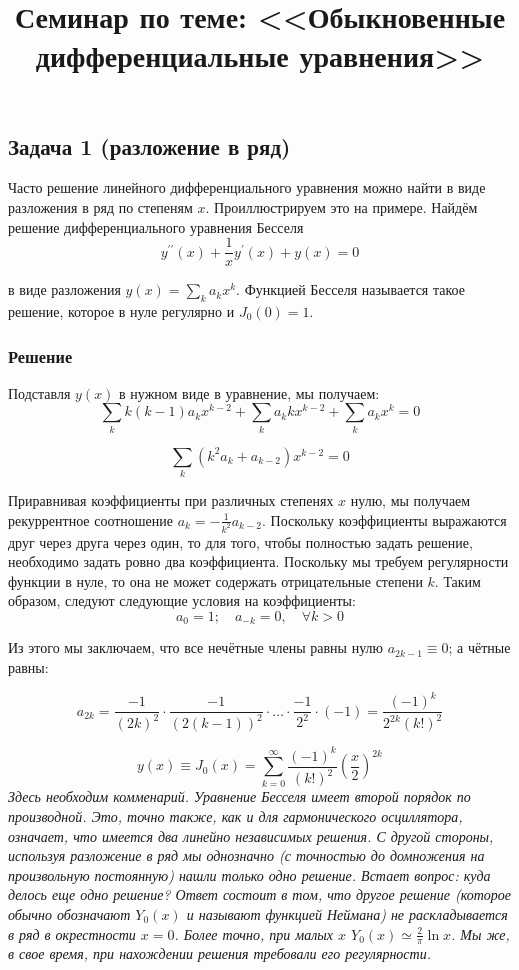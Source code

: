 \documentclass[a4paper,12pt]{article}
\begin{document}
\title{Семинар по теме: <<Обыкновенные дифференциальные уравнения>>}
\maketitle

\subsection*{Задача 1 (разложение в ряд)}

Часто решение линейного дифференциального уравнения можно найти в
виде разложения в ряд по степеням $x$. Проиллюстрируем это на примере.
Найдём решение дифференциального уравнения Бесселя
\[
y^{\prime\prime}(x)+\frac{1}{x}y^{\prime}(x)+y(x)=0
\]

\noindent
в виде разложения $y(x)=\sum_{k}a_{k}x^{k}$. Функцией Бесселя называется
такое решение, которое в нуле регулярно и $J_{0}(0)=1$.


\subsubsection*{Решение}

Подставля $y(x)$ в нужном виде в уравнение, мы получаем:
\[
\sum_{k}k(k-1)a_{k}x^{k-2}+\sum_{k}a_{k}kx^{k-2}+\sum_{k}a_{k}x^{k}=0
\]


\[
\sum_{k}(k^{2}a_{k}+a_{k-2})x^{k-2}=0
\]

\noindent
Приравнивая коэффициенты при различных степенях $x$ нулю, мы получаем
рекуррентное соотношение $a_{k}=-\frac{1}{k^{2}}a_{k-2}$. Поскольку
коэффициенты выражаются друг через друга через один, то для того,
чтобы полностью задать решение, необходимо задать ровно два коэффициента. Поскольку мы требуем регулярности функции в нуле, то она
не может содержать отрицательные степени $k$. Таким образом, следуют
следующие условия на коэффициенты:
\[
a_{0}=1;\quad a_{-k}=0,\quad\forall k>0
\]

\noindent
Из этого мы заключаем, что все нечётные члены равны нулю $a_{2k-1}\equiv0$;
а чётные равны:

\[
a_{2k}=\frac{-1}{(2k)^{2}}\cdot\frac{-1}{(2(k-1))^{2}}\cdot\dots\cdot\frac{-1}{2^{2}}\cdot(-1)=\frac{(-1)^{k}}{2^{2k}(k!)^{2}}
\]


\[
y(x)\equiv J_{0}(x)=\sum_{k=0}^{\infty}\frac{(-1)^{k}}{(k!)^{2}}\left(\frac{x}{2}\right)^{2k}
\]
\noindent
\textit{Здесь необходим комменарий. Уравнение Бесселя имеет второй порядок по производной. Это, точно также, как и для гармонического осциллятора, означает, что имеется два линейно независимых решения. С другой стороны, используя разложение в ряд мы однозначно (с точностью до домножения на произвольную постоянную) нашли только одно решение. Встает вопрос: куда делось еще одно решение? Ответ состоит в том, что другое решение (которое обычно обозначают $Y_0(x)$ и называют функцией Неймана) не раскладывается в ряд в окрестности $x=0$. Более точно, при малых $x$ $Y_0(x)\simeq \frac{2}{\pi}\ln x$. Мы же, в свое время, при нахождении решения требовали его регулярности.}
\end{document}
